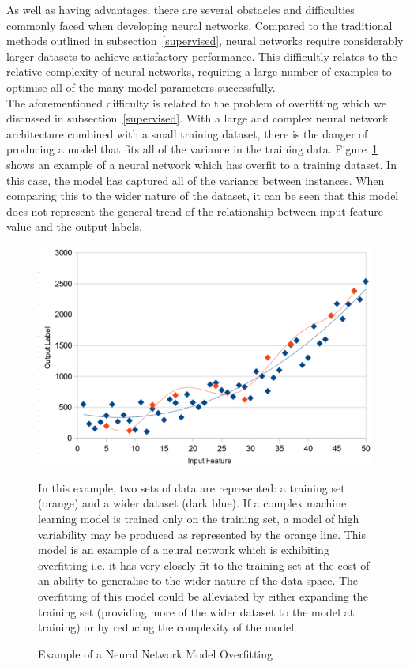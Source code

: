 \noindent
As well as having advantages, there are several obstacles and difficulties commonly faced when developing neural networks. Compared to the traditional methods outlined in subsection~\ref{supervised}, neural networks require considerably larger datasets to achieve satisfactory performance. This difficultly relates to the relative complexity of neural networks, requiring a large number of examples to optimise all of the many model parameters successfully.\\

\noindent
The aforementioned difficulty is related to the problem of overfitting which we discussed in subsection~\ref{supervised}. With a large and complex neural network architecture combined with a small training dataset, there is the danger of producing a model that fits all of the variance in the training data. Figure~\ref{fig:overfittingNN} shows an example of a neural network which has overfit to a training dataset. In this case, the model has captured all of the variance between instances. When comparing this to the wider nature of the dataset, it can be seen that this model does not represent the general trend of the relationship between input feature value and the output labels.

\begin{figure}[h]
	\centering
	\includegraphics[scale=0.3]{Figures/overfittingNN.png}
	\caption{Example of a Neural Network Model Overfitting} {In this example, two sets of data are represented: a training set (orange) and a wider dataset (dark blue). If a complex machine learning model is trained only on the training set, a model of high variability may be produced as represented by the orange line. This model is an example of a neural network which is exhibiting overfitting i.e. it has very closely fit to the training set at the cost of an ability to generalise to the wider nature of the data space. The overfitting of this model could be alleviated by either expanding the training set (providing more of the wider dataset to the model at training) or by reducing the complexity of the model. }
	\label{fig:overfittingNN}
\end{figure}

